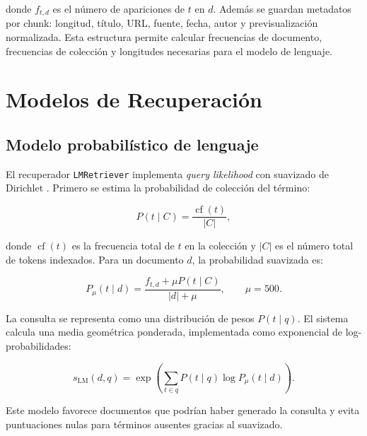 \documentclass[a4paper]{llncs}
\begin{document}
donde $f_{t,d}$ es el número de apariciones de $t$ en $d$. Además se guardan metadatos por chunk: longitud, título, URL, fuente, fecha, autor y previsualización normalizada. Esta estructura permite calcular frecuencias de documento, frecuencias de colección y longitudes necesarias para el modelo de lenguaje.

\section{Modelos de Recuperación}

\subsection{Modelo probabilístico de lenguaje}

El recuperador \texttt{LMRetriever} implementa \textit{query likelihood} con suavizado de Dirichlet \cite{zhai2001study}. Primero se estima la probabilidad de colección del término:

\begin{equation}
P(t \mid C)=\frac{\operatorname{cf}(t)}{|C|},
\end{equation}

donde $\operatorname{cf}(t)$ es la frecuencia total de $t$ en la colección y $|C|$ es el número total de tokens indexados. Para un documento $d$, la probabilidad suavizada es:

\begin{equation}
P_{\mu}(t \mid d)=
\frac{f_{t,d}+\mu P(t \mid C)}{|d|+\mu},
\qquad \mu=500.
\end{equation}

La consulta se representa como una distribución de pesos $P(t\mid q)$. El sistema calcula una media geométrica ponderada, implementada como exponencial de log-probabilidades:

\begin{equation}
s_{\mathrm{LM}}(d,q)=
\exp\left(
\sum_{t\in q} P(t\mid q)\log P_{\mu}(t\mid d)
\right).
\end{equation}

Este modelo favorece documentos que podrían haber generado la consulta y evita puntuaciones nulas para términos ausentes gracias al suavizado.
\end{document}
